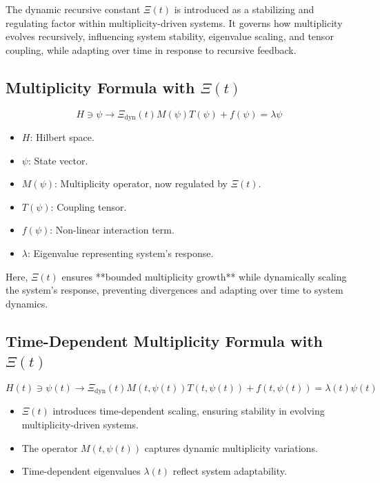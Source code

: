 \documentclass{article}
\theoremstyle{plain}
\begin{document}
\begin{itemize}
The dynamic recursive constant \(\Xi(t) \) is introduced as a stabilizing and regulating factor within multiplicity-driven systems. It governs how multiplicity evolves recursively, influencing system stability, eigenvalue scaling, and tensor coupling, while adapting over time in response to recursive feedback.

\subsection{Multiplicity Formula with \(\Xi(t) \)}

\begin{equation}
H \ni \psi \to \Xi_{\text{dyn}}(t) M(\psi) T(\psi) + f(\psi) = \lambda \psi
\end{equation}

\begin{itemize}
    \item \( H \): Hilbert space.
    \item \( \psi \): State vector.
    \item \( M(\psi) \): Multiplicity operator, now regulated by \(\Xi(t) \).
    \item \( T(\psi) \): Coupling tensor.
    \item \( f(\psi) \): Non-linear interaction term.
    \item \( \lambda \): Eigenvalue representing system's response.
\end{itemize}

Here, \(\Xi(t) \) ensures **bounded multiplicity growth** while dynamically scaling the system's response, preventing divergences and adapting over time to system dynamics.

\subsection{Time-Dependent Multiplicity Formula with \(\Xi(t) \)}

\begin{equation}
H(t) \ni \psi(t) \to \Xi_{\text{dyn}}(t) M(t, \psi(t))T(t, \psi(t)) + f(t, \psi(t)) = \lambda(t) \psi(t)
\end{equation}

\begin{itemize}
    \item \(\Xi(t) \) introduces time-dependent scaling, ensuring stability in evolving multiplicity-driven systems.
    \item The operator \( M(t, \psi(t)) \) captures dynamic multiplicity variations.
    \item Time-dependent eigenvalues \( \lambda(t) \) reflect system adaptability.
\end{itemize}


\end{itemize}
\end{document}
